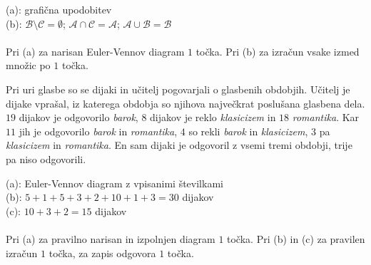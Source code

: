 \documentclass[addpoints]{exam}
\begin{document}
\begin{questions}

    \begin{solution}[8cm]
        (a): grafična upodobitev \\
        (b): $\mathcal{B}\setminus\mathcal{C}=\emptyset$; $\mathcal{A}\cap\mathcal{C}=\mathcal{A}$; $\mathcal{A}\cup\mathcal{B}=\mathcal{B}$ \\ \\
        Pri (a) za narisan Euler-Vennov diagram $1$ točka. Pri (b) za izračun vsake izmed množic po $1$ točka.
    \end{solution}






    
    \question
    Pri uri glasbe so se dijaki in učitelj pogovarjali o glasbenih obdobjih.  Učitelj je dijake vprašal, iz katerega obdobja so njihova največkrat poslušana glasbena dela.
    $19$ dijakov je odgovorilo \textit{barok}, $8$ dijakov je reklo \textit{klasicizem} in $18$ \textit{romantika}. Kar $11$ jih je odgovorilo \textit{barok} in \textit{romantika}, $4$ so rekli \textit{barok} in \textit{klasicizem},
    $3$ pa \textit{klasicizem} in \textit{romantika}. En sam dijaki je odgovoril z vsemi tremi obdobji, trije pa niso odgovorili. 

    \begin{solution}[8cm]
        (a): Euler-Vennov diagram z vpisanimi številkami \\
        (b): $5+1+5+3+2+10+1+3=30$ dijakov \\
        (c): $10+3+2=15$ dijakov \\ \\
        Pri (a) za pravilno narisan in izpolnjen diagram $1$ točka. Pri (b) in (c) za pravilen izračun $1$ točka, za zapis odgovora $1$ točka.
    \end{solution}





\end{questions}
\end{document}
